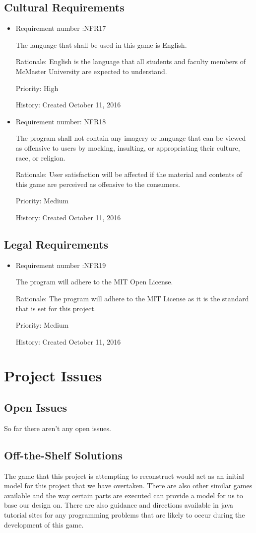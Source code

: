 \documentclass[12pt,letterpaper]{article}
\begin{document}
\subsection{Cultural Requirements}
\begin{itemize}
	\item Requirement number :NFR17 
	
	The language that shall be used in this game is English.

	Rationale: English is the language that all students and faculty members of McMaster University are expected to understand.

	Priority: High
	
	History: Created October 11, 2016

	\item Requirement number: NFR18

	The program shall not contain any imagery or language that can be viewed as offensive to users by mocking, insulting, or appropriating their culture, race, or religion.

	Rationale: User satisfaction will be affected if the material and contents of this game are perceived as offensive to the consumers.

	Priority: Medium

	History: Created October 11, 2016
\end{itemize}
\subsection{Legal Requirements}
\begin{itemize}
	\item Requirement number :NFR19   
	
	The program will adhere to the MIT Open License.

	Rationale: The program will adhere to the MIT License as it is the standard that is set for this project.
	
	Priority: Medium   
	
	History: Created October 11, 2016   
\end{itemize}
\section{Project Issues}
\subsection{Open Issues}
So far there aren’t any open issues.
\subsection{Off-the-Shelf Solutions}
The game that this project is attempting to reconstruct would act as an initial model for this project that we have overtaken. There are also other similar games available and the way certain parts are executed can provide a model for us to base our design on. There are also guidance and directions available in java tutorial sites for any programming problems that are likely to occur during the development of this game.  
\end{document}
